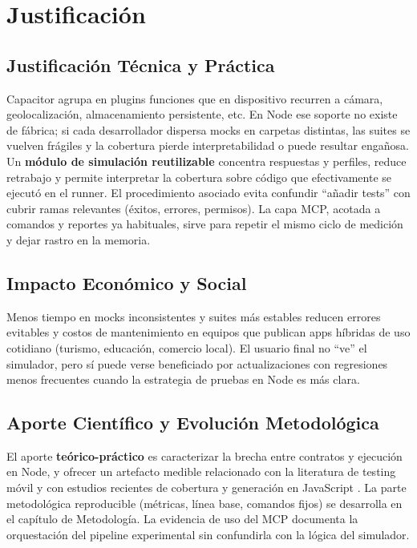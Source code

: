 \section{Justificación}
\label{chap:justificacion}

\subsection{Justificación Técnica y Práctica}
\label{sec:justificacion_tecnica_practica}
Capacitor agrupa en plugins funciones que en dispositivo recurren a cámara, geolocalización, almacenamiento persistente, etc. En Node ese soporte no existe de fábrica; si cada desarrollador dispersa mocks en carpetas distintas, las suites se vuelven frágiles y la cobertura pierde interpretabilidad o puede resultar engañosa. Un \textbf{módulo de simulación reutilizable} concentra respuestas y perfiles, reduce retrabajo y permite interpretar la cobertura sobre código que efectivamente se ejecutó en el runner. El procedimiento asociado evita confundir ``añadir tests'' con cubrir ramas relevantes (éxitos, errores, permisos). La capa MCP, acotada a comandos y reportes ya habituales, sirve para repetir el mismo ciclo de medición y dejar rastro en la memoria.

\subsection{Impacto Económico y Social}
\label{sec:impacto_economico_social}
Menos tiempo en mocks inconsistentes y suites más estables reducen errores evitables y costos de mantenimiento en equipos que publican apps híbridas de uso cotidiano (turismo, educación, comercio local). El usuario final no ``ve'' el simulador, pero sí puede verse beneficiado por actualizaciones con regresiones menos frecuentes cuando la estrategia de pruebas en Node es más clara.

\subsection{Aporte Científico y Evolución Metodológica}
\label{sec:aporte_cientifico_metodologico}
El aporte \textbf{teórico-práctico} es caracterizar la brecha entre contratos  y ejecución en Node, y ofrecer un artefacto medible relacionado con la literatura de testing móvil \cite{nie2023gui_mobile_mapping} y con estudios recientes de cobertura y generación en JavaScript \cite{schafer2024testpilot,olsthoorn2024syntest_javascript}. La parte metodológica reproducible (métricas, línea base, comandos fijos) se desarrolla en el capítulo de Metodología. La evidencia de uso del MCP \cite{mcp-spec2025} documenta la orquestación del pipeline experimental sin confundirla con la lógica del simulador.
